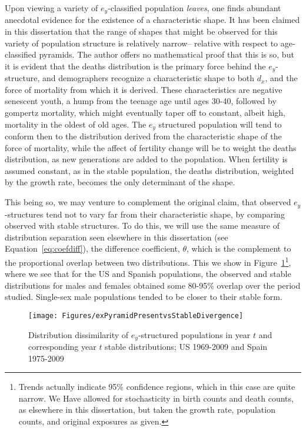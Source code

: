  \FloatBarrier
Upon viewing a variety of $e_y$-classified population \textit{leaves}, one finds
abundant anecdotal evidence for the existence of a characteristic shape. It has
been claimed in this dissertation that the range of shapes that might be
observed for this variety of population structure is relatively narrow--
relative with respect to age-classified pyramids. The author offers no
mathematical proof that this is so, but it is evident that the deaths
distribution is the primary force behind the $e_y$-structure, and demographers
recognize a characteristic shape to both $d_x$, and the force of mortality from
which it is derived. These characteristics are negative senescent youth, a hump
from the teenage age until ages 30-40, followed by gompertz mortality, which
might eventually taper off to constant, albeit high, mortality in the oldest of
old ages\citep{horiuchi1998deceleration, vaupel1997trajectories}. The $e_y$
structured population will tend to conform then to the distribution derived from 
the characteristic shape of the force of mortality,
while the affect of fertility change will be to weight the deaths distribution,
as new generations are added to the population. When fertility is assumed
constant, as in the stable population, the deaths distribution, weighted by 
the growth rate, becomes the only determinant of the shape. 

This being so, we may venture to complement the original claim, that observed
$e_y$-structures tend not to vary far from their characteristic shape, by
comparing observed with stable structures. To do this, we will use the same 
measure of distribution separation seen elsewhere in this dissertation (see
Equation~\eqref{eq:coefdiff}), the difference coefficient, $\theta$, which is
the complement to the proportional overlap between two distributions. This we show in
Figure~\ref{fig:exstablepyr}\footnote{Trends actually indicate 95\% confidence
regions, which in this case are quite narrow. We Have allowed for
stochasticity in birth counts and death counts, as elsewhere in this
dissertation, but taken the growth rate, population counts, and original
exposures as given.}, where we see that for the US and Spanish populations, the
observed and stable distributions for males and females obtained some 80-95\%
overlap over the period studied. Single-sex male populations tended to be closer
to their stable form.

\begin{figure}[ht!]
       \centering
       \caption{Distribution dissimilarity of $e_y$-structured populations in
       year $t$ and corresponding year $t$ stable distributions; US 1969-2009
       and Spain 1975-2009}
        \texttt{[image: Figures/exPyramidPresentvsStableDivergence]}
        \label{fig:exstablepyr}
\end{figure}


